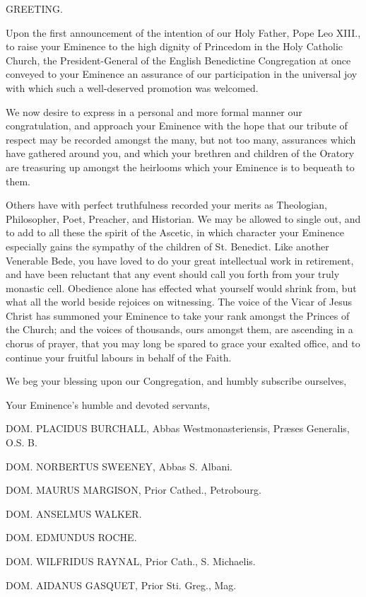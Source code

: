 GREETING.

Upon the first announcement of the intention of our Holy Father,
Pope Leo XIII., to raise your Eminence to the high dignity of
Princedom in the Holy Catholic Church, the President-General of the
English Benedictine Congregation at once conveyed to your Eminence an assurance of our participation in the universal joy with
which such a well-deserved promotion was welcomed.

We now desire to express in a personal and more formal manner our
congratulation, and approach your Eminence with the hope that our
tribute of respect may be recorded amongst the many, but not too many,
assurances which have gathered around you, and which your brethren and
children of the Oratory are treasuring up amongst the heirlooms which
your Eminence is to bequeath to them.

Others have with perfect truthfulness recorded your merits as
Theologian, Philosopher, Poet, Preacher, and Historian. We may be
allowed to single out, and to add to all these the spirit of the
Ascetic, in which character your Eminence especially gains the
sympathy of the children of St. Benedict. Like another Venerable Bede,
you have loved to do your great intellectual work in retirement, and
have been reluctant that any event should call you forth from your
truly monastic cell. Obedience alone has effected what yourself would
shrink from, but what all the world beside rejoices on witnessing. The
voice of the Vicar of Jesus Christ has summoned your Eminence to take
your rank amongst the Princes of the Church; and the voices of
thousands, ours amongst them, are ascending in a chorus of prayer, that you may long be spared to grace your exalted office, and
to continue your fruitful labours in behalf of the Faith.

We beg your blessing upon our Congregation, and humbly subscribe
ourselves,

Your Eminence's humble and devoted servants,

DOM. PLACIDUS BURCHALL,
Abbas Westmonasteriensis, Præses Generalis, O.S. B.

DOM. NORBERTUS SWEENEY,
Abbas S. Albani.

DOM. MAURUS MARGISON,
Prior Cathed., Petrobourg.

DOM. ANSELMUS WALKER.

DOM. EDMUNDUS ROCHE.

DOM. WILFRIDUS RAYNAL,
Prior Cath., S. Michaelis.

DOM. AIDANUS GASQUET,
Prior Sti. Greg., Mag.

